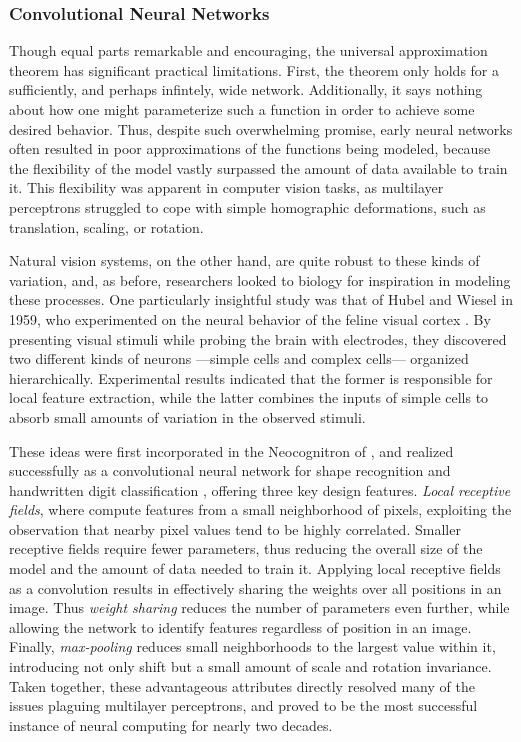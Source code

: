 \subsubsection{Convolutional Neural Networks}
\label{subsec:convnets}


Though equal parts remarkable and encouraging, the universal approximation theorem has significant practical limitations.
First, the theorem only holds for a sufficiently, and perhaps infintely, wide network.
Additionally, it says nothing about how one might parameterize such a function in order to achieve some desired behavior.
Thus, despite such overwhelming promise, early neural networks often resulted in poor approximations of the functions being modeled, because the flexibility of the model vastly surpassed the amount of data available to train it.
This flexibility was apparent in computer vision tasks, as multilayer perceptrons struggled to cope with simple homographic deformations, such as translation, scaling, or rotation.

Natural vision systems, on the other hand, are quite robust to these kinds of variation, and, as before, researchers looked to biology for inspiration in modeling these processes.
One particularly insightful study was that of Hubel and Wiesel in 1959, who experimented on the neural behavior of the feline visual cortex \cite{}.
By presenting visual stimuli while probing the brain with electrodes, they discovered two different kinds of neurons ---simple cells and complex cells--- organized hierarchically.
Experimental results indicated that the former is responsible for local feature extraction, while the latter combines the inputs of simple cells to absorb small amounts of variation in the observed stimuli.

These ideas were first incorporated in the Neocognitron of \cite{Fukushima1988}, and realized successfully as a convolutional neural network for shape recognition and handwritten digit classification \cite{LeCun1990, LeCun1998},  offering three key design features.
\emph{Local receptive fields}, where compute features from a small neighborhood of pixels, exploiting the observation that nearby pixel values tend to be highly correlated.
Smaller receptive fields require fewer parameters, thus reducing the overall size of the model and the amount of data needed to train it.
Applying local receptive fields as a convolution results in effectively sharing the weights over all positions in an image.
Thus \emph{weight sharing} reduces the number of parameters even further, while allowing the network to identify features regardless of position in an image.
Finally, \emph{max-pooling} reduces small neighborhoods to the largest value within it, introducing not only shift but a small amount of scale and rotation invariance.
Taken together, these advantageous attributes directly resolved many of the issues plaguing multilayer perceptrons, and proved to be the most successful instance of neural computing for nearly two decades.


